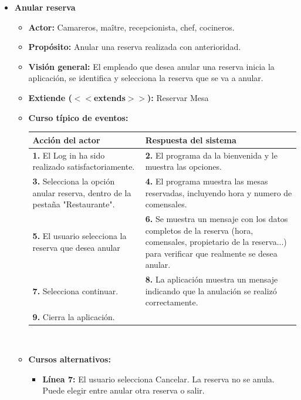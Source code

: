 \documentclass[spanish,a4paper,12pt]{report}		%
\begin{document}
\begin{itemize}
		\item \textbf{Anular reserva}
			\begin{itemize}
			\item \textbf{Actor:} Camareros, maître, recepcionista, chef, cocineros.
			\item \textbf{Propósito: } Anular una reserva realizada con anterioridad.
			\item \textbf{Visión general:} El empleado que desea anular una reserva inicia la aplicación, se identifica y selecciona la reserva que se va a anular.
			\item \textbf{Extiende ($<<$extends$>>$):} Reservar Mesa
			\item \textbf{Curso típico de eventos:} 	\\
				\begin{tabular}{|p{6cm}||p{6cm}|}
				\hline
				\textbf{Acción del actor} & \textbf{Respuesta del sistema} \\ \hline \hline
				\textbf{1.}  El Log in ha sido realizado satisfactoriamente. & \textbf{2.} El programa da la bienvenida y le muestra las opciones. \\ \hline
				\textbf{3.} Selecciona la opción anular reserva, dentro de la pestaña "Restaurante". & \textbf{4.} El programa muestra las mesas reservadas, incluyendo hora y numero de comensales. \\ \hline
				\textbf{5.} El usuario selecciona la reserva que desea anular	& \textbf{6.} Se muestra un mensaje con los datos completos de la reserva (hora, comensales, propietario de la reserva...) para verificar que realmente se desea anular. \\ \hline
				\textbf{7.} Selecciona continuar.	& \textbf{8.} La aplicación muestra un mensaje indicando que la anulación se realizó correctamente. \\ \hline
				\textbf{9.} Cierra la aplicación. & \textbf{} \\ \hline
			\end{tabular}
			\\
			\item \textbf{Cursos alternativos:} 
			\begin{itemize}
			\item  \textbf{Línea 7:} El usuario selecciona Cancelar. La reserva no se anula. Puede elegir entre anular otra reserva o salir.
			\end {itemize}
		\end {itemize}
	


\end{itemize}
\end{document}
